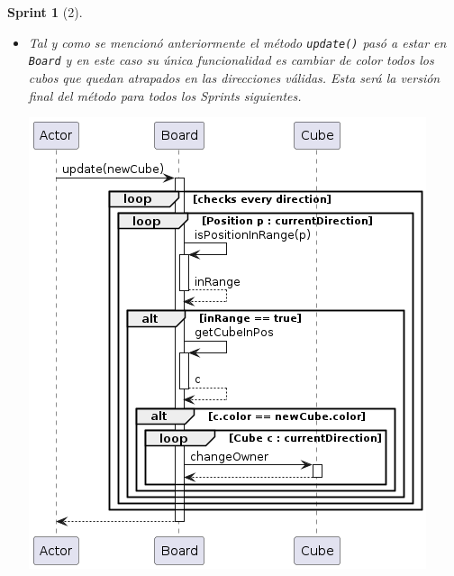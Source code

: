 \documentclass[12pt,a4paper,openright]{book}
\theoremstyle{break}
\newtheorem*{sprint}{Sprint}
\begin{document}
\begin{sprint}[2]
\begin{itemize}
\item Tal y como se mencionó anteriormente el método \texttt{update()} pasó a estar en \texttt{Board} y en este caso su única funcionalidad es cambiar de color todos los cubos que quedan atrapados en las direcciones válidas. Esta será la versión final del método para todos los Sprints siguientes.
\begin{center}
\includegraphics[scale=0.5]{Board.update()-sprint7.png}
\end{center}
\end{itemize} 
\end{sprint}
\newpage
\end{document}
